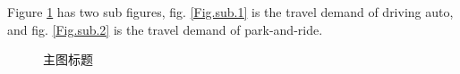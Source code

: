 \documentclass[12pt]{ctexart}
\begin{document}
Figure \ref{Fig.main} 
has two sub figures, 
fig. \ref{Fig.sub.1} is the travel demand of driving auto,
and fig. \ref{Fig.sub.2} is the travel demand of park-and-ride.

\begin{figure}[htbp]
    \centering  %
    \subfigure[子图2标题]{%
        \label{Fig.sub.2}
        \texttt{[image: image\_p2.png]}}%
    \caption{主图标题}
    \label{Fig.main}%
\end{figure}
\end{document}
